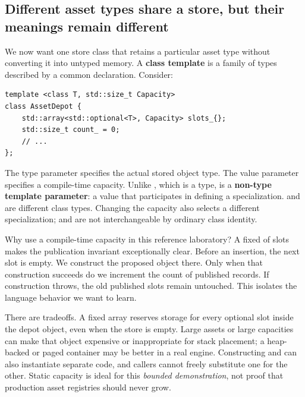 \subsection{Different asset types share a store, but their meanings remain different}\label{01-foundations-i-ch005-different-asset-types-share-a-store-but-their-meanings-remain-different}

\hypertarget{01-foundations-i-ch005-different-asset-types-share-a-store-but-their-meanings-remain-different}{}

We now want one store class that retains a particular asset type without converting it into untyped memory. A \textbf{class template} is a family of types described by a common declaration. Consider:

\begin{verbatim}
template <class T, std::size_t Capacity>
class AssetDepot {
    std::array<std::optional<T>, Capacity> slots_{};
    std::size_t count_ = 0;
    // ...
};
\end{verbatim}

The type parameter  specifies the actual stored object type. The value parameter  specifies a compile-time capacity. Unlike , which is a type,  is a \textbf{non-type template parameter}: a value that participates in defining a specialization.  and  are different class types. Changing the capacity also selects a different specialization;  and  are not interchangeable by ordinary class identity.

Why use a compile-time capacity in this reference laboratory? A fixed  of  slots makes the publication invariant exceptionally clear. Before an insertion, the next slot is empty. We construct the proposed object there. Only when that construction succeeds do we increment the count of published records. If construction throws, the old published slots remain untouched. This isolates the language behavior we want to learn.

There are tradeoffs. A fixed array reserves storage for every optional slot inside the depot object, even when the store is empty. Large assets or large capacities can make that object expensive or inappropriate for stack placement; a heap-backed or paged container may be better in a real engine. Constructing  and  can also instantiate separate code, and callers cannot freely substitute one for the other. Static capacity is ideal for this \emph{bounded demonstration}, not proof that production asset registries should never grow.

